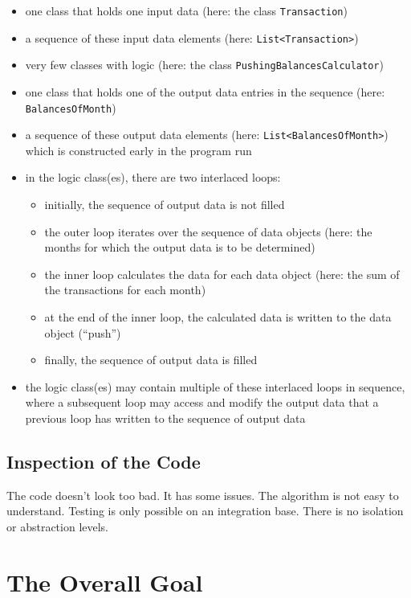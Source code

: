 \documentclass[a4paper,fleqn,titlepage,11pt]{article}
\begin{document}
\begin{itemize}
\item one class that holds one input data (here: the class \texttt{Transaction})
\item a sequence of these input data elements (here: \texttt{List<Transaction>})
\item very few classes with logic (here: the class \texttt{PushingBalancesCalculator})
\item one class that holds one of the output data entries in the sequence (here: \texttt{BalancesOfMonth})
\item a sequence of these output data elements (here: \texttt{List<BalancesOfMonth>}) which is constructed early in the program run
\item in the logic class(es), there are two interlaced loops: 
\begin{itemize}
\item initially, the sequence of output data is not filled
\item the outer loop iterates over the sequence of data objects (here: the months for which the output data is to be determined)
\item the inner loop calculates the data for each data object (here: the sum of the transactions for each month)
\item at the end of the inner loop, the calculated data is written to the data object (``push'')
\item finally, the sequence of output data is filled
\end{itemize}
\item the logic class(es) may contain multiple of these interlaced loops in sequence, where a subsequent loop may access and modify the output data that a previous loop has written to the sequence of output data
\end{itemize}

\subsection{Inspection of the Code}
The code doesn't look too bad. It has some issues. The algorithm is not easy to understand. Testing is only possible on an integration base. There is no isolation or abstraction levels.

\section{The Overall Goal}
\end{document}
